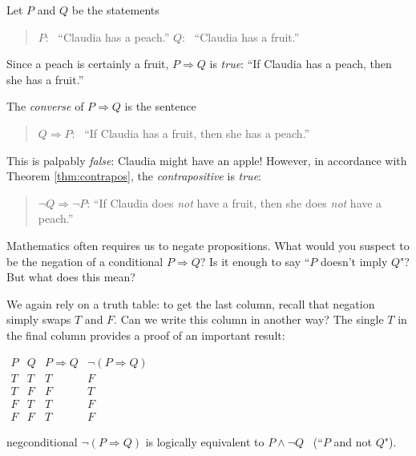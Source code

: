 \begin{example}{}{}
	Let $P$ and $Q$ be the statements
	\begin{quote}
	  $P$: \ ``Claudia has a peach.''\qquad\qquad
	  $Q$: \ ``Claudia has a fruit.''
	\end{quote}
	Since a peach is certainly a fruit, $P\Longrightarrow Q$ is \emph{true}: ``If Claudia has a peach, then she has a fruit.''
	\par
	The \emph{converse} of $P\Longrightarrow Q$ is the sentence
	\begin{quote}
	  $Q\Longrightarrow P$: \ ``If Claudia has a fruit, then she has a peach.''
	\end{quote}
	This is palpably \emph{false}: Claudia might have an apple! However, in accordance with Theorem \ref{thm:contrapos}, the \emph{contrapositive} is \emph{true}:
	\begin{quote}
	  $\neg Q\Longrightarrow \neg P$: ``If Claudia does \emph{not} have a fruit, then she does \emph{not} have a peach.''
	\end{quote} 
\end{example}

 

Mathematics often requires us to negate propositions. What would you suspect to be the negation of a conditional $P\Longrightarrow Q$? Is it enough to say ``$P$ doesn't imply $Q$"? But what does this mean? 

\begin{minipage}[t]{0.64\linewidth}\vspace{-2pt}
	We again rely on a truth table: to get the last column, recall that negation simply swaps $T$ and $F$. Can we write this column in another way? The single $T$ in the final column provides a proof of an important result:
\end{minipage}
\hfill
\begin{minipage}[t]{0.35\linewidth}\vspace{-5pt}
	\flushright%
	$\begin{array}{cc|c|c}
		P & Q & P\Longrightarrow Q & \neg(P\Longrightarrow Q)\\\hline
		T & T & T & F\\
		T & F & F & T\\
		F & T & T & F\\
		F & F & T & F
	\end{array}$
\end{minipage}

\begin{thm}{}{negconditional}
	$\neg(P\Longrightarrow Q)$ is logically equivalent to $P\wedge\neg Q$ \ (``$P$ and not $Q$").
\end{thm}


